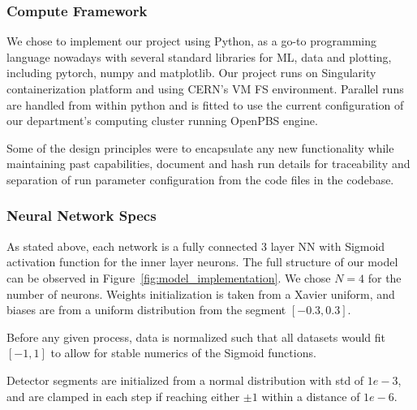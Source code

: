 \documentclass[../../ddppaper2.tex]{subfiles}
\begin{document}


\subsubsection{Compute Framework}

We chose to implement our project using Python, as a go-to programming language nowadays with several standard libraries for ML, data and plotting, including pytorch, numpy and matplotlib. Our project runs on Singularity containerization platform and using CERN's VM FS environment. Parallel runs are handled from within python and is fitted to use the current configuration of our department's computing cluster running OpenPBS engine.

Some of the design principles were to encapsulate any new functionality while maintaining past capabilities, document and hash run details for traceability and separation of run parameter configuration from the code files in the codebase.

\subsubsection{Neural Network Specs}

As stated above, each network is a fully connected 3 layer NN with Sigmoid activation function for the inner layer neurons. The full structure of our model can be observed in Figure~\ref{fig:model_implementation}. We chose $N=4$ for the number of neurons. Weights initialization is taken from a Xavier uniform, and biases are from a uniform distribution from the segment $[-0.3, 0.3]$.

Before any given process, data is normalized such that all datasets would fit $[-1, 1]$ to allow for stable numerics of the Sigmoid functions.

Detector segments are initialized from a normal distribution with std of $1e-3$, and are clamped in each step if reaching either $\pm 1$ within a distance of $1e-6$.
\end{document}
